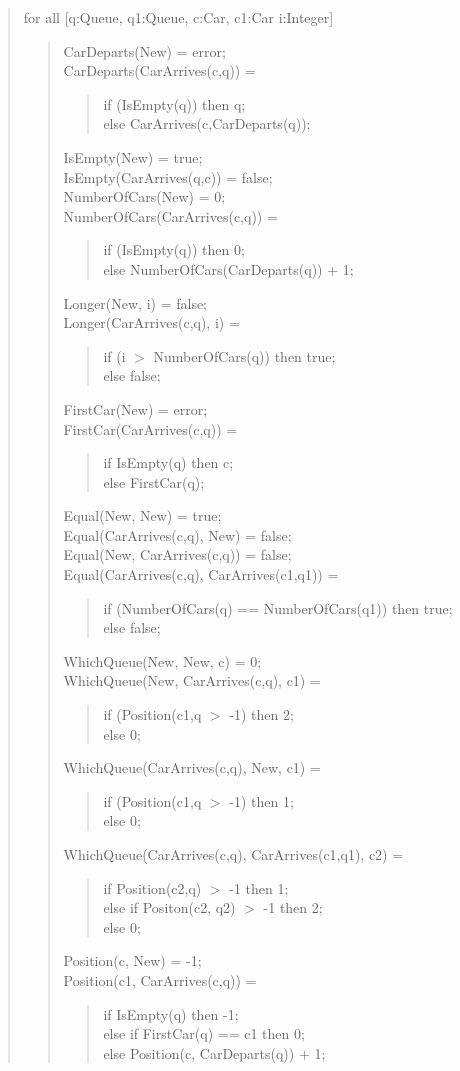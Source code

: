 \documentclass[letterpaper,12pt]{article}
\begin{document}
\begin{quote}
 \newpage
 for all [q:Queue, q1:Queue, c:Car, c1:Car i:Integer]
 \begin{quote}
  CarDeparts(New) = error;\\
  CarDeparts(CarArrives(c,q)) =
  \begin{quote}
   if (IsEmpty(q)) then q;\\
   else CarArrives(c,CarDeparts(q));
  \end{quote}
  IsEmpty(New) = true;\\
  IsEmpty(CarArrives(q,c)) = false;\\
  NumberOfCars(New) = 0;\\
  NumberOfCars(CarArrives(c,q)) =
  \begin{quote}
   if (IsEmpty(q)) then 0;\\
   else NumberOfCars(CarDeparts(q)) + 1;
  \end{quote}
  Longer(New, i) = false;\\
  Longer(CarArrives(c,q), i) =
  \begin{quote}
   if (i $>$ NumberOfCars(q)) then true;\\
   else false;
  \end{quote}
  FirstCar(New) = error;\\
  FirstCar(CarArrives(c,q)) =
  \begin{quote}
   if IsEmpty(q) then c;\\
   else FirstCar(q);
  \end{quote}
  Equal(New, New) = true;\\
  Equal(CarArrives(c,q), New) = false;\\
  Equal(New, CarArrives(c,q)) = false;\\
  Equal(CarArrives(c,q), CarArrives(c1,q1)) =
  \begin{quote}
   if (NumberOfCars(q) == NumberOfCars(q1)) then true;\\
   else false;
  \end{quote}
  WhichQueue(New, New, c) = 0;\\
  WhichQueue(New, CarArrives(c,q), c1) =
  \begin{quote}
   if (Position(c1,q $>$ -1) then 2;\\
   else 0;
  \end{quote}
  WhichQueue(CarArrives(c,q), New, c1) =
  \begin{quote}
   if (Position(c1,q $>$ -1) then 1;\\
   else 0;
  \end{quote}
  WhichQueue(CarArrives(c,q), CarArrives(c1,q1), c2) =
  \begin{quote}
   if Position(c2,q) $>$ -1 then 1;\\
   else if Positon(c2, q2) $>$ -1 then 2;\\
   else 0;
  \end{quote}
  Position(c, New) = -1;\\
  Position(c1, CarArrives(c,q)) =
  \begin{quote}
   if IsEmpty(q) then -1;\\
   else if FirstCar(q) == c1 then 0;\\
   else Position(c, CarDeparts(q)) + 1;
  \end{quote}
  

\end{quote}
\end{quote}
\end{document}
